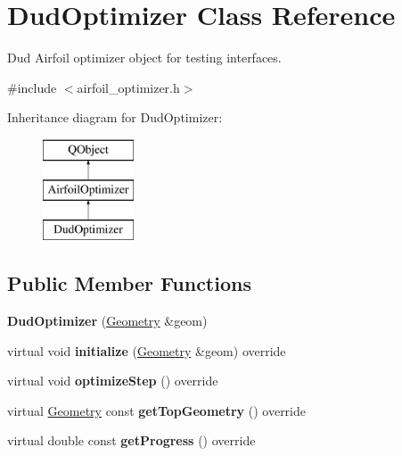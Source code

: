 \hypertarget{class_dud_optimizer}{}\section{Dud\+Optimizer Class Reference}
\label{class_dud_optimizer}


Dud Airfoil optimizer object for testing interfaces.  




{\ttfamily \#include $<$airfoil\+\_\+optimizer.\+h$>$}

Inheritance diagram for Dud\+Optimizer\+:\begin{figure}[H]
\begin{center}
\leavevmode
\includegraphics[height=3.000000cm]{class_dud_optimizer}
\end{center}
\end{figure}
\subsection*{Public Member Functions}
\begin{DoxyCompactItemize}
\item 
\mbox{\label{class_dud_optimizer_af26b9a7008edc72eab4904e4412ec807}} 
{\bfseries Dud\+Optimizer} (\hyperlink{class_geometry}{Geometry} \&geom)
\item 
\mbox{\label{class_dud_optimizer_a1cab6b6d9290cd8b573946eae396ac4a}} 
virtual void {\bfseries initialize} (\hyperlink{class_geometry}{Geometry} \&geom) override
\item 
\mbox{\label{class_dud_optimizer_a6bb45a864903a58c7b030f94f388e094}} 
virtual void {\bfseries optimize\+Step} () override
\item 
\mbox{\label{class_dud_optimizer_af20d6c98319f93ea3d3ee82736900eb5}} 
virtual \hyperlink{class_geometry}{Geometry} const {\bfseries get\+Top\+Geometry} () override
\item 
\mbox{\label{class_dud_optimizer_ac5cb8e4b437fb0bd9584541e43939809}} 
virtual double const {\bfseries get\+Progress} () override
\end{DoxyCompactItemize}
